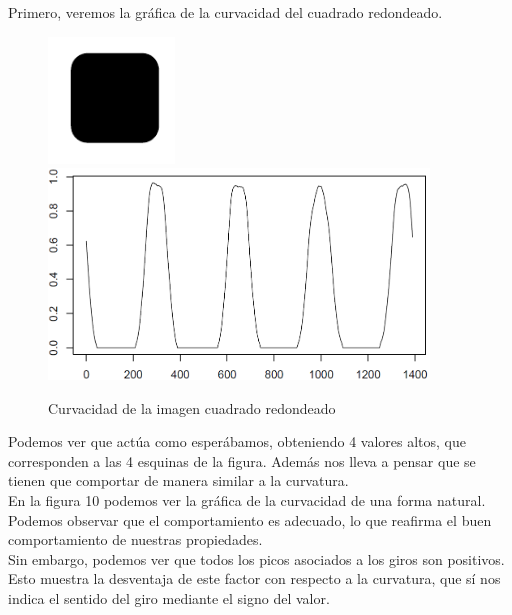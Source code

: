 Primero, veremos la gráfica de la curvacidad del cuadrado redondeado.

\begin{figure}[H]
\begin{center}

\includegraphics[width=0.3\textwidth]{img/device3-1.png}
\includegraphics[width=0.9\textwidth]{img/nolin-dev3-1-limpio-0815.png}
\end{center}

\caption{Curvacidad de la imagen cuadrado redondeado}
\end{figure}

Podemos ver que actúa como esperábamos, obteniendo 4 valores altos, que corresponden a las 4 esquinas de la figura. Además nos lleva a pensar que se tienen que comportar de manera similar a la curvatura.\\

En la figura 10 podemos ver la gráfica de la curvacidad de una forma natural. Podemos observar que el comportamiento es adecuado, lo que reafirma el buen comportamiento de nuestras propiedades.\\

Sin embargo, podemos ver que todos los picos asociados a los giros son positivos. Esto muestra la desventaja de este factor con respecto a la curvatura, que sí nos indica el sentido del giro mediante el signo del valor.\\

